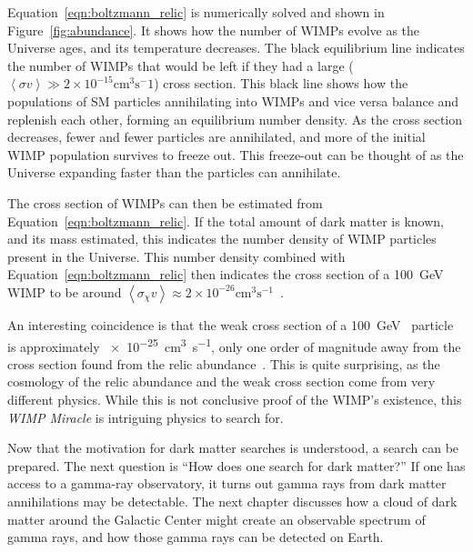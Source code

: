 Equation~\ref{eqn:boltzmann_relic} is numerically solved and shown in Figure~\ref{fig:abundance}.
It shows how the number of WIMPs evolve as the Universe ages, and its temperature decreases.
The black equilibrium line indicates the number of WIMPs that would be left if they had a large ($\left \langle \sigma v \right \rangle \gg 2 \times 10^{-15} \textrm{cm}^3 \textrm{s}^-1$) cross section.
This black line shows how the populations of SM particles annihilating into WIMPs and vice versa balance and replenish each other, forming an equilibrium number density.
As the cross section decreases, fewer and fewer particles are annihilated, and more of the initial WIMP population survives to freeze out.
This freeze-out can be thought of as the Universe expanding faster than the particles can annihilate.

The cross section of WIMPs can then be estimated from Equation~\ref{eqn:boltzmann_relic}.
If the total amount of dark matter is known, and its mass estimated, this indicates the number density of WIMP particles present in the Universe.
This number density combined with Equation~\ref{eqn:boltzmann_relic} then indicates the cross section of a \SI{100}{\GeV{}} WIMP to be around $\left \langle \sigma_{\chi} v \right \rangle \approx 2 \times 10^{-26} \textrm{cm}^{3}\textrm{s}^{-1}$~\cite{updatedWIMPRelicCrossSection}.

An interesting coincidence is that the weak cross section of a \SI{100}{\GeV{}} particle is approximately \SI{e-25}{cm^3s^{-1}}, only one order of magnitude away from the cross section found from the relic abundance~\cite{Jungman:1995df}.
This is quite surprising, as the cosmology of the relic abundance and the weak cross section come from very different physics.
While this is not conclusive proof of the WIMP's existence, this \textit{WIMP Miracle} is intriguing physics to search for.

Now that the motivation for dark matter searches is understood, a search can be prepared.
The next question is ``How does one search for dark matter?''
If one has access to a gamma-ray observatory, it turns out gamma rays from dark matter annihilations may be detectable.
The next chapter discusses how a cloud of dark matter around the Galactic Center might create an observable spectrum of gamma rays, and how those gamma rays can be detected on Earth.

